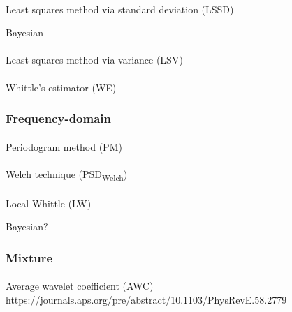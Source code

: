\documentclass[
  sn-vancouver,
  Numbered,
  referee,
  lineno]{sn-jnl}
\makeatletter
\let\oldparagraph\paragraph
\renewcommand{\paragraph}{
    \@ifstar
      \xxxParagraphStar
      \xxxParagraphNoStar
  }
\newcommand{\xxxParagraphStar}[1]{\oldparagraph*{#1}\mbox{}}
\newcommand{\xxxParagraphNoStar}[1]{\oldparagraph{#1}\mbox{}}
\makeatother
\begin{document}
\paragraph{Least squares method via standard deviation
(LSSD)}\label{least-squares-method-via-standard-deviation-lssd}

Bayesian

\paragraph{Least squares method via variance
(LSV)}\label{least-squares-method-via-variance-lsv}

\paragraph{Whittle's estimator (WE)}\label{whittles-estimator-we}

\subsubsection{Frequency-domain}\label{frequency-domain}

\paragraph{Periodogram method (PM)}\label{periodogram-method-pm}

\paragraph{\texorpdfstring{Welch technique
(PSD\textsubscript{Welch})}{Welch technique (PSDWelch)}}\label{welch-technique-psdwelch}

\paragraph{Local Whittle (LW)}\label{local-whittle-lw}

Bayesian?

\subsubsection{Mixture}\label{mixture}

\paragraph{Average wavelet coefficient (AWC)
https://journals.aps.org/pre/abstract/10.1103/PhysRevE.58.2779}\label{average-wavelet-coefficient-awc-httpsjournals.aps.orgpreabstract10.1103physreve.58.2779}
\end{document}
